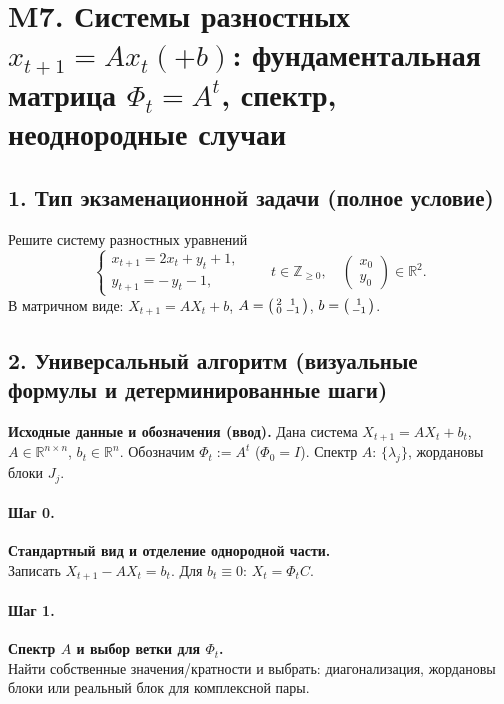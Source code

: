 \section{M7. Системы разностных \(x_{t+1}=A x_t(+b)\): фундаментальная матрица \(\Phi_t=A^t\), спектр, неоднородные случаи}

\subsection*{1. Тип экзаменационной задачи (полное условие)}
Решите систему разностных уравнений
\[
\begin{cases}
x_{t+1}=2x_t+y_t+1,\\[2pt]
y_{t+1}=-\,y_t-1,
\end{cases}
\qquad t\in\mathbb Z_{\ge 0},\quad
\begin{pmatrix}x_0\\y_0\end{pmatrix}\in\mathbb R^2.
\]
В матричном виде: \(X_{t+1}=A X_t+b\), \(A=\begin{psmallmatrix}2&1\\0&-1\end{psmallmatrix}\), \(b=\begin{psmallmatrix}1\\-1\end{psmallmatrix}\).

\subsection*{2. Универсальный алгоритм (визуальные формулы и детерминированные шаги)}

\textbf{Исходные данные и обозначения (ввод).}
Дана система \(X_{t+1}=A X_t+b_t\), \(A\in\mathbb R^{n\times n}\), \(b_t\in\mathbb R^n\). Обозначим \(\Phi_t:=A^t\) (\(\Phi_0=I\)). Спектр \(A\): \(\{\lambda_j\}\), жордановы блоки \(J_j\).

\paragraph{Шаг 0.} \textbf{Стандартный вид и отделение однородной части.}\\
Записать \(X_{t+1}-A X_t=b_t\). Для \(b_t\equiv0\): \(X_t=\Phi_t C\).

\paragraph{Шаг 1.} \textbf{Спектр \(A\) и выбор ветки для \(\Phi_t\).}\\
Найти собственные значения/кратности и выбрать: диагонализация, жордановы блоки или реальный блок для комплексной пары.

